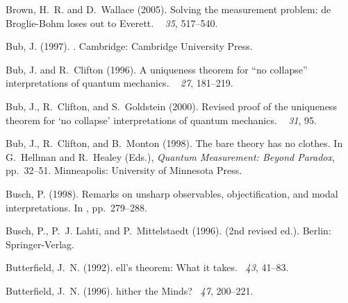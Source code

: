\documentclass[12pt]{article}
\begin{document}
\begin{thebibliography}{}
Brown, H.~R. and D.~Wallace (2005).
\newblock Solving the measurement problem: de {B}roglie-{B}ohm loses out to
  {E}verett.
~{\em
  35}, 517--540.

Bub, J. (1997).
.
\newblock Cambridge: Cambridge University Press.

Bub, J. and R.~Clifton (1996).
\newblock A uniqueness theorem for ``no collapse'' interpretations of quantum
  mechanics.
~{\em
  27}, 181--219.

Bub, J., R.~Clifton, and S.~Goldstein (2000).
\newblock Revised proof of the uniqueness theorem for `no collapse'
  interpretations of quantum mechanics.
~{\em
  31}, 95.

Bub, J., R.~Clifton, and B.~Monton (1998).
\newblock The bare theory has no clothes.
\newblock In G.~Hellman and R.~Healey (Eds.), {\em Quantum Measurement: Beyond
  Paradox}, pp.\  32--51. Minneapolis: University of Minnesota Press.

Busch, P. (1998).
\newblock Remarks on unsharp observables, objectification, and modal
  interpretations.
\newblock In , pp.\  279--288.

Busch, P., P.~J. Lahti, and P.~Mittelstaedt (1996).
 (2nd revised ed.).
\newblock Berlin: Springer-Verlag.

Butterfield, J.~N. (1992).
ell's theorem: What it takes.
~{\em 43},
  41--83.

Butterfield, J.~N. (1996).
hither the {M}inds?
~{\em 47},
  200--221.


\end{thebibliography}
\end{document}
